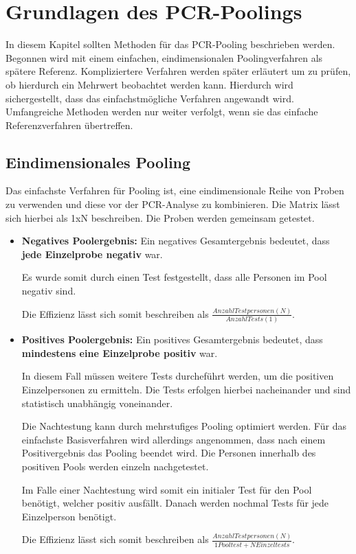 \cleardoublepage
\chapter{Grundlagen des PCR-Poolings}
In diesem Kapitel sollten Methoden für das PCR-Pooling beschrieben werden.
Begonnen wird mit einem einfachen, eindimensionalen Poolingverfahren als spätere Referenz.
Kompliziertere Verfahren werden später erläutert um zu prüfen, ob hierdurch ein Mehrwert beobachtet werden kann.
Hierdurch wird sichergestellt, dass das einfachstmögliche Verfahren angewandt wird.
Umfangreiche Methoden werden nur weiter verfolgt, wenn sie das einfache Referenzverfahren übertreffen.

\section{Eindimensionales Pooling}
Das einfachste Verfahren für Pooling ist, eine eindimensionale Reihe von Proben zu verwenden und diese vor der PCR-Analyse zu kombinieren.
Die Matrix lässt sich hierbei als 1xN beschreiben.
Die Proben werden gemeinsam getestet.
\begin{itemize}
	\item \textbf{Negatives Poolergebnis:}\newline
	Ein negatives Gesamtergebnis bedeutet, dass \textbf{jede Einzelprobe negativ} war.
	
	Es wurde somit durch einen Test festgestellt, dass alle Personen im Pool negativ sind.
	
	Die Effizienz lässt sich somit beschreiben als $\frac{Anzahl Testpersonen (N)}{Anzahl Tests (1)} $.
	
	\item \textbf{Positives Poolergebnis:}\newline
	Ein positives Gesamtergebnis bedeutet, dass \textbf{mindestens eine Einzelprobe positiv} war.
	
	In diesem Fall müssen weitere Tests durcheführt werden, um die positiven Einzelpersonen zu ermitteln.
	Die Tests erfolgen hierbei nacheinander und sind statistisch unabhängig voneinander.
	
	Die Nachtestung kann durch mehrstufiges Pooling optimiert werden.
	Für das einfachste Basisverfahren wird allerdings angenommen, dass nach einem Positivergebnis das Pooling beendet wird.
	Die Personen innerhalb des positiven Pools werden einzeln nachgetestet.
	
	Im Falle einer Nachtestung wird somit ein initialer Test für den Pool benötigt, welcher positiv ausfällt.
	Danach werden nochmal Tests für jede Einzelperson benötigt.
	
	Die Effizienz lässt sich somit beschreiben als $\frac{Anzahl Testpersonen (N)}{1 Pooltest + N Einzeltests} $.
\end{itemize}



